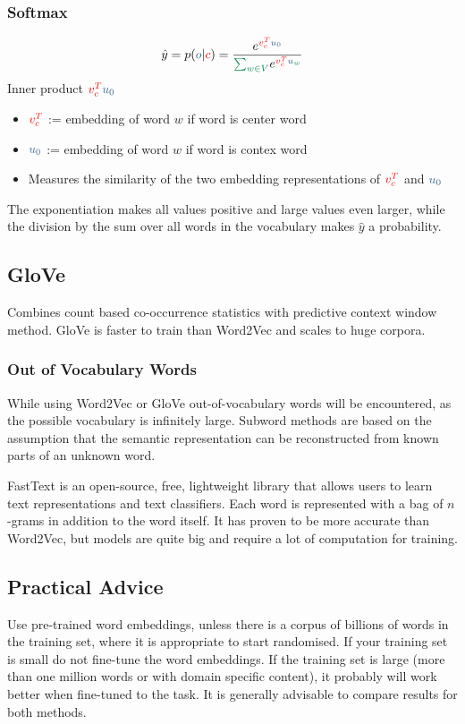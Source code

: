 \documentclass[11pt]{article}
\begin{document}
\subsubsection{Softmax}
\begin{equation*}
	\hat{y} = p({\color{SteelBlue4}o}|{\color{red}c}) = \frac{e^{{\color{red}v_c^T}{\color{SteelBlue4} u_0}}}{{\color{SpringGreen4}\sum_{w\in V}} e^{{\color{red}v_c^T}{\color{SteelBlue4} u}_{\color{SpringGreen4} w}}}
\end{equation*}
Inner product ${\color{red}v_c^T}{\color{SteelBlue4} u_0}$
\begin{itemize}[label=-]
	\item ${\color{red}v_c^T}$ := embedding of word $w$ if word is {\color{red} center} word
	\item ${\color{SteelBlue4} u_0}$ := embedding of word $w$ if word is {\color{SteelBlue4} contex} word
	\item Measures the similarity of the two embedding representations of ${\color{red}v_c^T}$ and ${\color{SteelBlue4} u_0}$
\end{itemize}
The exponentiation makes all values positive and large values even larger, while the division by the {\color{SpringGreen4} sum over all words in the vocabulary} makes $\hat{y}$ a probability.

\subsection{GloVe}
Combines count based co-occurrence statistics with predictive context window method. GloVe is faster to train than Word2Vec and scales to huge corpora.

\subsubsection{Out of Vocabulary Words}
While using Word2Vec or GloVe out-of-vocabulary words will be encountered, as the possible vocabulary is infinitely large. Subword methods are based on the assumption that the semantic representation can be reconstructed from known parts of an unknown word.

FastText is an open-source, free, lightweight library that allows users to learn text representations and text classifiers. Each word is represented with a bag of $n$-grams in addition to the
word itself. It has proven to be more accurate than Word2Vec, but models are quite big and require a lot of computation for training.

\subsection{Practical Advice}
Use pre-trained word embeddings, unless there is a corpus of billions of words in the training set, where it is appropriate to start randomised. If your training set is small do not fine-tune the word embeddings. If the training set is large (more than one million words or with domain specific content), it probably will work better when fine-tuned to the task. It is generally advisable to compare results for both methods.
\end{document}
